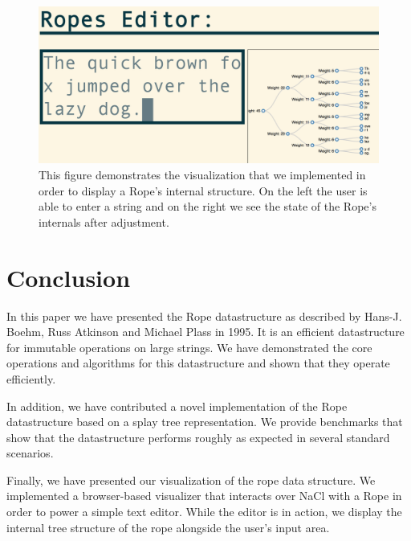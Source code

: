\documentclass[12pt]{article}
\begin{document}
\begin{figure}[h]
\begin{centering}
\includegraphics[scale=0.35]{editorImage1}
\caption{This figure demonstrates the visualization that we implemented in order to display a Rope's internal structure. On the left the user is able to enter a string and on the right we see the state of the Rope's internals after adjustment.}\label{editor}

\end{centering}
\end{figure}

\section{Conclusion}

In this paper we have presented the Rope datastructure as described by Hans-J. Boehm, Russ Atkinson and Michael Plass in 1995. It is an efficient datastructure for immutable operations on large strings. We have demonstrated the core operations and algorithms for this datastructure and shown that they operate efficiently.

In addition, we have contributed a novel implementation of the Rope datastructure based on a splay tree representation. We provide benchmarks that show that the datastructure performs roughly as expected in several standard scenarios.

Finally, we have presented our visualization of the rope data structure. We implemented a browser-based visualizer that interacts over NaCl with a Rope in order to power a simple text editor. While the editor is in action, we display the internal tree structure of the rope alongside the user's input area. 
\end{document}
